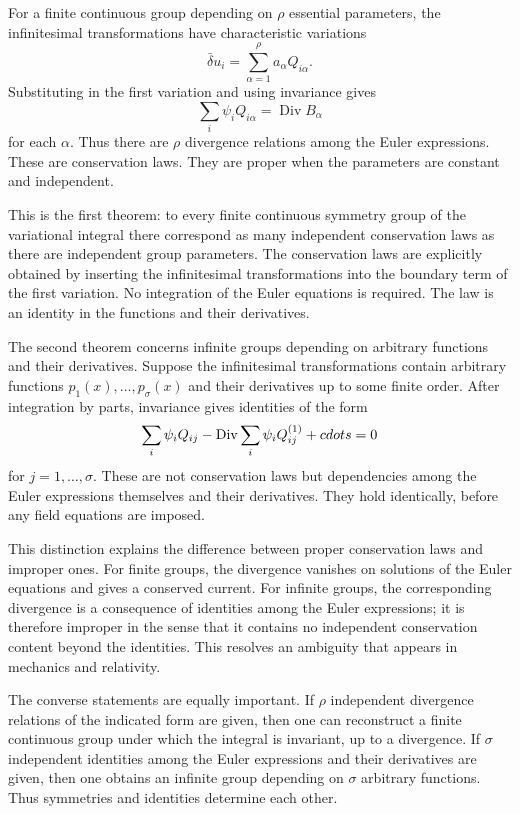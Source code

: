 \documentclass[11pt]{article}
\begin{document}
For a finite continuous group depending on \(\rho\) essential parameters, the infinitesimal
transformations have characteristic variations \[   \bar\delta u_i=\sum_{\alpha=1}^\rho a_\alpha
Q_{i\alpha}. \] Substituting in the first variation and using invariance gives \[   \sum_i \psi_i
Q_{i\alpha}=\operatorname{Div} B_\alpha \] for each \(\alpha\). Thus there are \(\rho\) divergence
relations among the Euler expressions. These are conservation laws. They are proper when the
parameters are constant and independent.


This is the first theorem: to every finite continuous symmetry group of the variational integral
there correspond as many independent conservation laws as there are independent group parameters.
The conservation laws are explicitly obtained by inserting the infinitesimal transformations into
the boundary term of the first variation. No integration of the Euler equations is required. The law
is an identity in the functions and their derivatives.


The second theorem concerns infinite groups depending on arbitrary functions and their derivatives.
Suppose the infinitesimal transformations contain arbitrary functions \(p_1(x), \ldots,p_\sigma(x)\)
and their derivatives up to some finite order. After integration by parts, invariance gives
identities of the form \[   \sum_i \psi_i Q_{ij}-\operatorname{Div}\sum_i \psi_i
Q_{ij}^{(1)}+\\cdots=0 \] for \(j=1, \ldots, \sigma\). These are not conservation laws but
dependencies among the Euler expressions themselves and their derivatives. They hold identically,
before any field equations are imposed.


This distinction explains the difference between proper conservation laws and improper ones. For
finite groups, the divergence vanishes on solutions of the Euler equations and gives a conserved
current. For infinite groups, the corresponding divergence is a consequence of identities among the
Euler expressions; it is therefore improper in the sense that it contains no independent
conservation content beyond the identities. This resolves an ambiguity that appears in mechanics and
relativity.


The converse statements are equally important. If \(\rho\) independent divergence relations of the
indicated form are given, then one can reconstruct a finite continuous group under which the
integral is invariant, up to a divergence. If \(\sigma\) independent identities among the Euler
expressions and their derivatives are given, then one obtains an infinite group depending on
\(\sigma\) arbitrary functions. Thus symmetries and identities determine each other.
\end{document}
